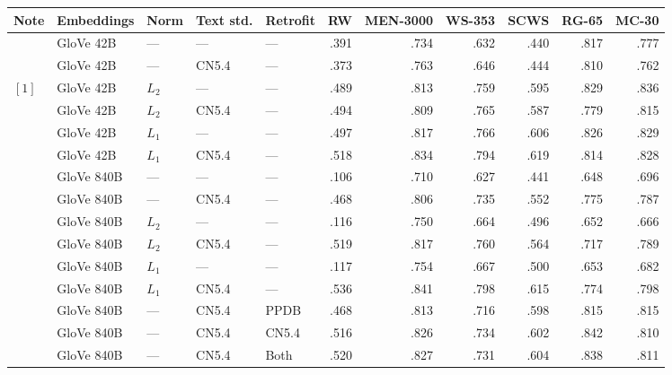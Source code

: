 \documentclass[letterpaper]{article}
\begin{document}
\begin{table*}[t]
\centering
\begin{tabular}{lllllrrrrrr}
\toprule
Note &Embeddings   & Norm  & Text std. & Retrofit &       RW & MEN-3000 &    WS-353 &      SCWS &    RG-65 &    MC-30 \\
\midrule
     &GloVe 42B    & ---   & ---       & ---      &     .391 &     .734 &      .632 &      .440 &     .817 &     .777 \\
     &GloVe 42B    & ---   & CN5.4     & ---      &     .373 &     .763 &      .646 &      .444 &     .810 &     .762 \\
$[1]$&GloVe 42B    & $L_2$ & ---       & ---      &     .489 &     .813 &      .759 &      .595 &     .829 &     .836 \\
     &GloVe 42B    & $L_2$ & CN5.4     & ---      &     .494 &     .809 &      .765 &      .587 &     .779 &     .815 \\
     &GloVe 42B    & $L_1$ & ---       & ---      &     .497 &     .817 &      .766 &      .606 &     .826 &     .829 \\
     &GloVe 42B    & $L_1$ & CN5.4     & ---      &     .518 &     .834 &      .794 &      .619 &     .814 &     .828 \\
\midrule
     &GloVe 840B   & ---   & ---       & ---      &     .106 &     .710 &      .627 &      .441 &     .648 &     .696 \\
     &GloVe 840B   & ---   & CN5.4     & ---      &     .468 &     .806 &      .735 &      .552 &     .775 &     .787 \\
     &GloVe 840B   & $L_2$ & ---       & ---      &     .116 &     .750 &      .664 &      .496 &     .652 &     .666 \\
     &GloVe 840B   & $L_2$ & CN5.4     & ---      &     .519 &     .817 &      .760 &      .564 &     .717 &     .789 \\
     &GloVe 840B   & $L_1$ & ---       & ---      &     .117 &     .754 &      .667 &      .500 &     .653 &     .682 \\
     &GloVe 840B   & $L_1$ & CN5.4     & ---      &     .536 &     .841 &      .798 &      .615 &     .774 &     .798 \\
\midrule
     &GloVe 840B   & ---   & CN5.4     & PPDB     &     .468 &     .813 &      .716 &      .598 &     .815 &     .815 \\
     &GloVe 840B   & ---   & CN5.4     & CN5.4    &     .516 &     .826 &      .734 &      .602 &     .842 &     .810 \\
     &GloVe 840B   & ---   & CN5.4     & Both     &     .520 &     .827 &      .731 &      .604 &     .838 &     .811 \\

\end{tabular}
\end{table*}
\end{document}
